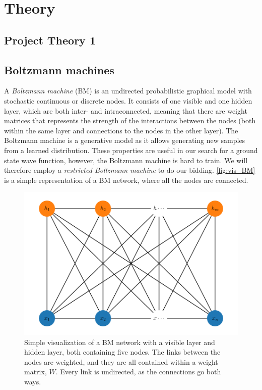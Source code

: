 \section{Theory}\label{sec:Theory}

\subsection{Project Theory 1}\label{sec:project theory}

\subsection{Boltzmann machines}
A \textit{Boltzmann machine} (BM) is an undirected probabilistic graphical model with stochastic continuous or discrete nodes. It consists of one visible and one hidden layer, which are both inter- and intraconnected, meaning that there are weight matrices that represents the strength of the interactions between the nodes (both within the same layer and connections to the nodes in the other layer). The Boltzmann machine is a generative model as it allows generating new samples from a learned distribution. These properties are useful in our search for a ground state wave function, however, the Boltzmann machine is hard to train. We will therefore employ a \textit{restricted Boltzmann machine} to do our bidding.  \autoref{fig:vis_BM} is a simple representation of a BM network, where all the nodes are connected. 

\begin{figure}[H]
\begin{center}\includegraphics[scale=0.5]{latex/latex-report/Images/bm_visualize.pdf}
\end{center}
\caption{Simple visualization of a BM network with a visible layer and hidden layer, both containing five nodes. The links between the nodes are weighted, and they are all contained within a weight matrix, $W$. Every link is undirected, as the connections go both ways.}
\label{fig:vis_BM}
\end{figure}

